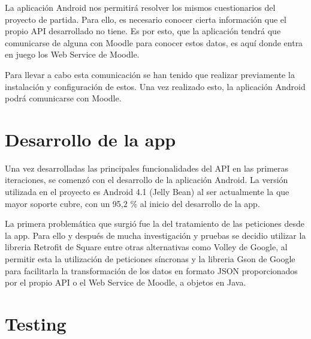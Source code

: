 La aplicación Android nos permitirá resolver los mismos cuestionarios del proyecto de partida. Para ello, es necesario conocer cierta información que el propio API desarrollado no tiene. Es por esto, que la aplicación tendrá que comunicarse de alguna con Moodle para conocer estos datos, es aquí donde entra en juego los Web Service de Moodle. 

Para llevar a cabo esta comunicación se han tenido que realizar previamente la instalación y configuración de estos. Una vez realizado esto, la aplicación Android podrá comunicarse con Moodle.


\section{Desarrollo de la app}

Una vez desarrolladas las principales funcionalidades del API en las primeras iteraciones, se comenzó con el desarrollo de la aplicación Android.
La versión utilizada en el proyecto es Android 4.1 (Jelly Bean) al ser actualmente la que mayor soporte cubre, con un 95,2 \% al inicio del desarrollo de la app.

La primera problemática que surgió fue la del tratamiento de las peticiones desde la app. Para ello y después de mucha investigación y pruebas se decidio utilizar la libreria Retrofit de Square \cite{wiki:retrofit} entre otras alternativas como Volley \cite{wiki:volley} de Google, al permitir esta la utilización de peticiones síncronas y la libreria Gson de Google \cite{wiki:gson} para facilitarla la transformación de los datos en formato JSON proporcionados por el propio API o el Web Service de Moodle, a objetos en Java. 


\section{Testing}
